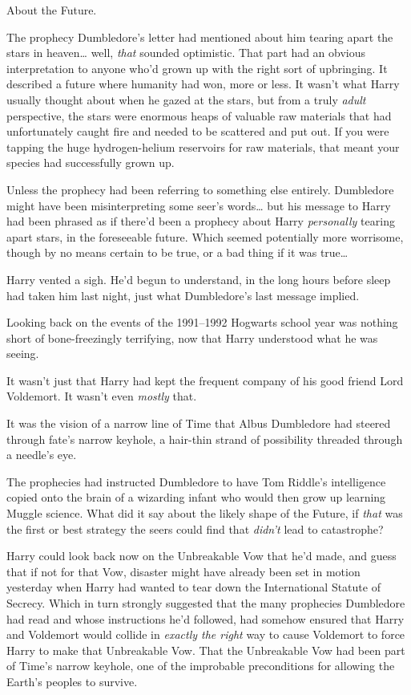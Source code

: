 About the Future.

The prophecy Dumbledore's letter had mentioned about him tearing apart the
stars in heaven{\ldots} well, \emph{that} sounded optimistic. That part had an
obvious interpretation to anyone who'd grown up with the right sort of
upbringing. It described a future where humanity had won, more or less. It
wasn't what Harry usually thought about when he gazed at the stars, but from a
truly \emph{adult} perspective, the stars were enormous heaps of valuable raw
materials that had unfortunately caught fire and needed to be scattered and put
out. If you were tapping the huge hydrogen-helium reservoirs for raw materials,
that meant your species had successfully grown up.

Unless the prophecy had been referring to something else entirely. Dumbledore
might have been misinterpreting some seer's words{\ldots} but his message to
Harry had been phrased as if there'd been a prophecy about Harry
\emph{personally} tearing apart stars, in the foreseeable future. Which seemed
potentially more worrisome, though by no means certain to be true, or a bad
thing if it was true{\ldots}

Harry vented a sigh. He'd begun to understand, in the long hours before sleep
had taken him last night, just what Dumbledore's last message implied.

Looking back on the events of the 1991--1992 Hogwarts school year was nothing
short of bone-freezingly terrifying, now that Harry understood what he was
seeing.

It wasn't just that Harry had kept the frequent company of his good friend Lord
Voldemort. It wasn't even \emph{mostly} that.

It was the vision of a narrow line of Time that Albus Dumbledore had steered
through fate's narrow keyhole, a hair-thin strand of possibility threaded
through a needle's eye.

The prophecies had instructed Dumbledore to have Tom Riddle's intelligence
copied onto the brain of a wizarding infant who would then grow up learning
Muggle science. What did it say about the likely shape of the Future, if
\emph{that} was the first or best strategy the seers could find that
\emph{didn't} lead to catastrophe?

Harry could look back now on the Unbreakable Vow that he'd made, and guess that
if not for that Vow, disaster might have already been set in motion yesterday
when Harry had wanted to tear down the International Statute of Secrecy. Which
in turn strongly suggested that the many prophecies Dumbledore had read and
whose instructions he'd followed, had somehow ensured that Harry and Voldemort
would collide in \emph{exactly the right} way to cause Voldemort to force Harry
to make that Unbreakable Vow. That the Unbreakable Vow had been part of Time's
narrow keyhole, one of the improbable preconditions for allowing the Earth's
peoples to survive.

